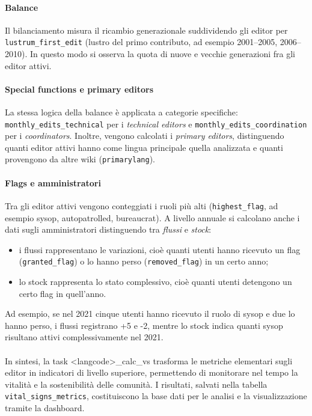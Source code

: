 \paragraph{Balance}  
Il bilanciamento misura il ricambio generazionale suddividendo gli editor per \texttt{lustrum\_first\_edit} (lustro del primo contributo, ad esempio 2001--2005, 2006--2010). 
In questo modo si osserva la quota di nuove e vecchie generazioni fra gli editor attivi.

\paragraph{Special functions e primary editors}  
La stessa logica della balance è applicata a categorie specifiche: 
\texttt{monthly\_edits\_technical} per i \emph{technical editors} e \texttt{monthly\_edits\_coordination} per i \emph{coordinators}. 
Inoltre, vengono calcolati i \emph{primary editors}, distinguendo quanti editor attivi hanno come lingua principale quella analizzata e quanti provengono da altre wiki (\texttt{primarylang}).

\paragraph{Flags e amministratori}  
Tra gli editor attivi vengono conteggiati i ruoli più alti (\texttt{highest\_flag}, ad esempio sysop, autopatrolled, bureaucrat). 
A livello annuale si calcolano anche i dati sugli amministratori distinguendo tra \emph{flussi} e \emph{stock}:  
\begin{itemize}
  \item i flussi rappresentano le variazioni, cioè quanti utenti hanno ricevuto un flag (\texttt{granted\_flag}) o lo hanno perso (\texttt{removed\_flag}) in un certo anno;  
  \item lo stock rappresenta lo stato complessivo, cioè quanti utenti detengono un certo flag in quell’anno.  
\end{itemize}
Ad esempio, se nel 2021 cinque utenti hanno ricevuto il ruolo di sysop e due lo hanno perso, i flussi registrano +5 e -2, mentre lo stock indica quanti sysop risultano attivi complessivamente nel 2021.

\paragraph{}  
In sintesi, la task \textless langcode\textgreater\_calc\_vs trasforma le metriche elementari sugli editor in indicatori di livello superiore, permettendo di monitorare nel tempo la vitalità e la sostenibilità delle comunità. I risultati, salvati nella tabella \texttt{vital\_signs\_metrics}, costituiscono la base dati per le analisi e la visualizzazione tramite la dashboard.

